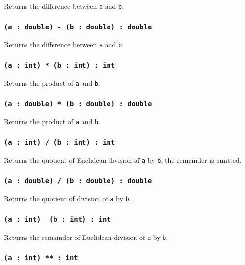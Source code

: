 Returns the difference between \texttt{a} and \texttt{b}.

\subsubsection{\texttt{(a : double) - (b : double) : double}}

Returns the difference between \texttt{a} and \texttt{b}.

\subsubsection{\texttt{(a : int) * (b : int) : int}}

Returns the product of \texttt{a} and \texttt{b}.

\subsubsection{\texttt{(a : double) * (b : double) : double}}

Returns the product of \texttt{a} and \texttt{b}.

\subsubsection{\texttt{(a : int) / (b : int) : int}}

Returns the quotient of Euclidean division of \texttt{a} by \texttt{b}, the remainder is omitted.

\subsubsection{\texttt{(a : double) / (b : double) : double}}

Returns the quotient of division of \texttt{a} by \texttt{b}.

\subsubsection{\texttt{(a : int) \ (b : int) : int}}

Returns the remainder of Euclidean division of \texttt{a} by \texttt{b}.


\subsubsection{\texttt{(a : int) ** : int}}

